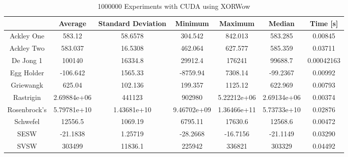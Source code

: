 \documentclass{article}
\begin{document}
	\begin{table}[h]
        \begin{centering}
            \begin{tabular}{|c||c|c|c|c|c|c|}
                \hline
                            & Average & Standard Deviation & Minimum & Maximum & Median & Time [s] \\
                \hline
                \hline
                Ackley One & 583.12 & 58.6578 & 304.542 & 842.013 & 583.285 & 0.00845 \\
                \hline
                Ackley Two & 583.037 & 16.5308 & 462.064 & 627.577 & 585.359 & 0.03711 \\
                \hline
                De Jong 1 & 100140 & 16334.8 & 29912.4 & 176241 & 99688.7 & 0.00042163\\
                \hline
                Egg Holder & -106.642 & 1565.33 & -8759.94 & 7308.14 & -99.2367 & 0.00992 \\
                \hline
                Griewangk & 625.04 & 102.136 & 199.357 & 1125.12 & 622.969 & 0.00793 \\
                \hline
                Rastrigin & 2.69884e+06 & 441123 & 902980 & 5.22212e+06 & 2.69134e+06 & 0.00374 \\
                \hline
                Rosenbrock's & 5.79781e+10 & 1.43681e+10 & 9.46702e+09 & 1.36466e+11 & 5.73733e+10 & 0.02876\\
                \hline
                Schwefel & 12556.5 & 1069.19 & 6795.11 & 17630.6 & 12568.6 & 0.00472 \\
                \hline
                SESW & -21.1838 & 1.25719 & -28.2668 & -16.7156 & -21.1149 & 0.03290 \\
                \hline
                SVSW & 303499 & 11836.1 & 225942 & 336821 & 303329 & 0.04492 \\
                \hline
            \end{tabular}
            \caption{1000000 Experiments with CUDA using XORWow}
        \end{centering}
        \end{table}
\end{document}
